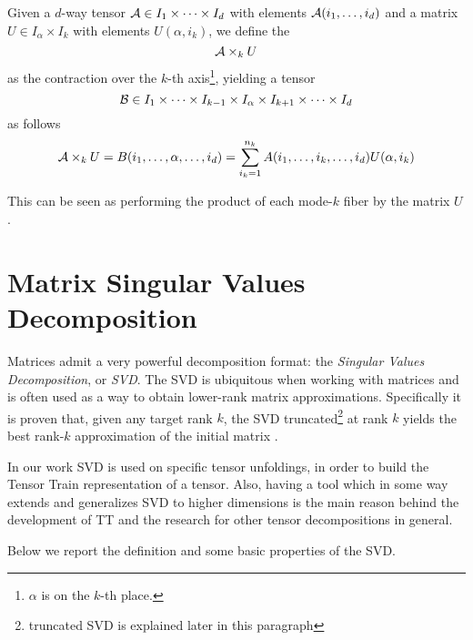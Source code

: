 \begin{Def} \label{def:tensor-matrix-product}
  Given a $d$-way tensor $\mathcal{A} \in I_1 \times \cdots \times I_d$ with elements $\mathcal{A}(i_1,\ldots,i_d)$ and a matrix $U \in I_\alpha \times I_k$ with elements $U(\alpha,i_k)$, we define the 
  \begin{equation*}
    \mathcal{A} \times_k U
  \end{equation*}
  as the contraction over the $k$-th axis\footnote{$\alpha$ is on the $k$-th place.}, yielding a tensor
  \begin{equation*}
    \mathcal{B} \in I_1 \times \cdots \times I_{k-1} \times I_\alpha \times I_{k+1} \times \cdots \times I_d
  \end{equation*}
  as follows
  \begin{equation*}
    \mathcal{A} \times_k U = B(i_1,\ldots,\alpha,\ldots,i_d) = \sum_{i_k = 1}^{n_k} A(i_1,\ldots,i_k,\ldots,i_d) U(\alpha,i_k)
  \end{equation*}
\end{Def}
This can be seen as performing the product of each mode-$k$ fiber by the matrix $U$.

\section{Matrix Singular Values Decomposition}
Matrices admit a very powerful decomposition format: the \emph{Singular Values Decomposition}, or \emph{SVD}. The SVD is ubiquitous when working with matrices and is often used as a way to obtain lower-rank matrix approximations. Specifically it is proven that, given any target rank $k$, the SVD truncated\footnote{truncated SVD is explained later in this paragraph} at rank $k$ yields the best rank-$k$ approximation of the initial matrix \cite{SVDbestapprox}.

In our work SVD is used on specific tensor unfoldings, in order to build the Tensor Train representation of a tensor. Also, having a tool which in some way extends and generalizes SVD to higher dimensions is the main reason behind the development of TT and the research for other tensor decompositions in general.

Below we report the definition and some basic properties of the SVD.

